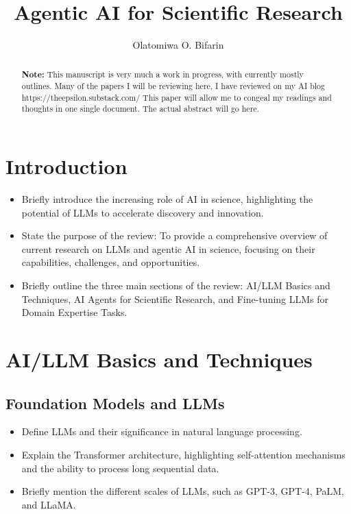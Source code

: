 \documentclass{article}
\title{Agentic AI for Scientific Research}
\author{Olatomiwa O. Bifarin}
\affil{School of Chemistry and Biochemistry\\Georgia Institute of Technology}
\begin{document}
\maketitle

\begin{abstract}
{\color{red}\textbf{Note:} This manuscript is very much a work in progress, with 
    currently mostly outlines. Many of the papers I will be reviewing here, I have 
    reviewed on my AI blog https://theepsilon.substack.com/ This paper will 
    allow me to congeal my readings and thoughts in one single document.}    
    The actual abstract will go here.
\end{abstract}

\section{Introduction}
\begin{itemize}
    \item Briefly introduce the increasing role of AI in science, highlighting the potential of LLMs to accelerate discovery and innovation.
    \item State the purpose of the review: To provide a comprehensive overview of current research on LLMs and agentic AI in science, focusing on their capabilities, challenges, and opportunities.
    \item Briefly outline the three main sections of the review: AI/LLM Basics and Techniques, AI Agents for Scientific Research, and Fine-tuning LLMs for Domain Expertise Tasks.
\end{itemize}

\section{AI/LLM Basics and Techniques}

\subsection{Foundation Models and LLMs}
\begin{itemize}
    \item Define LLMs and their significance in natural language processing.
    \item Explain the Transformer architecture, highlighting self-attention mechanisms and the ability to process long sequential data.
    \item Briefly mention the different scales of LLMs, such as GPT-3, GPT-4, PaLM, and LLaMA.
\end{itemize}
\end{document}
